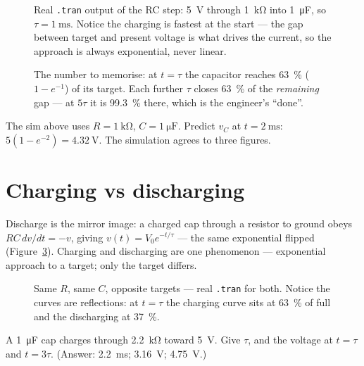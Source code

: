 \begin{figure}[htbp]
\centering

\caption{Real \texttt{.tran} output of the RC step: \qty{5}{\volt} through
\qty{1}{\kilo\ohm} into \qty{1}{\micro\farad}, so $\tau=\qty{1}{\milli\second}$.
Notice the charging is fastest at the start — the gap between target and
present voltage is what drives the current, so the approach is always
exponential, never linear.}
\label{fig:rcstep}
\end{figure}

\begin{figure}[htbp]
\centering

\caption{The number to memorise: at $t=\tau$ the capacitor reaches
\qty{63}{\percent} ($1-e^{-1}$) of its target. Each further $\tau$ closes
\qty{63}{\percent} of the \emph{remaining} gap — at $5\tau$ it is
\qty{99.3}{\percent} there, which is the engineer's ``done''.}
\label{fig:tau}
\end{figure}

\begin{checkpoint}
The sim above uses $R=\qty{1}{\kilo\ohm}$, $C=\qty{1}{\micro\farad}$.
Predict $v_C$ at $t=\qty{2}{\milli\second}$: $5(1-e^{-2})=\qty{4.32}{\volt}$.
The simulation agrees to three figures.
\end{checkpoint}

\section{Charging vs discharging}
\label{sec:chargedis}

Discharge is the mirror image: a charged cap through a resistor to ground
obeys $RC\,dv/dt = -v$, giving $v(t)=V_0 e^{-t/\tau}$ — the same exponential
flipped (Figure~\ref{fig:chargedis}). Charging and discharging are one
phenomenon — exponential approach to a target; only the target differs.

\begin{figure}[htbp]
\centering

\caption{Same $R$, same $C$, opposite targets — real \texttt{.tran} for both.
Notice the curves are reflections: at $t=\tau$ the charging curve sits at
\qty{63}{\percent} of full and the discharging at \qty{37}{\percent}.}
\label{fig:chargedis}
\end{figure}

\begin{exercise}[easy]
A \qty{1}{\micro\farad} cap charges through \qty{2.2}{\kilo\ohm} toward
\qty{5}{\volt}. Give $\tau$, and the voltage at $t=\tau$ and $t=3\tau$.
(Answer: \qty{2.2}{\milli\second}; \qty{3.16}{\volt}; \qty{4.75}{\volt}.)
\end{exercise}

